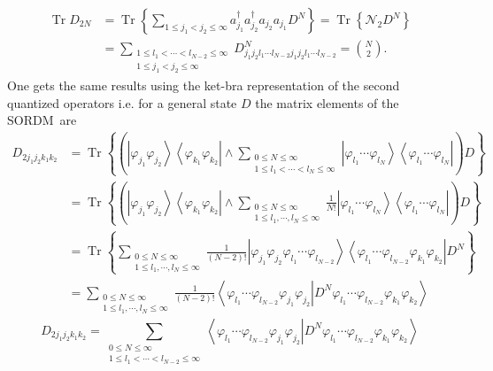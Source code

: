 \documentclass[aps,preprint]{revtex4}%
\begin{document}
\begin{align}
\operatorname{Tr}D_{2N} &  =\operatorname{Tr}\left\{  \sum_{1\leq j_{1}%
<j_{2}\leq\infty}a_{j_{1}}^{\dagger}a_{j_{2}}^{\dagger}a_{j_{2}}a_{j_{1}}%
D^{N}\right\}  =\operatorname{Tr}\left\{  \mathcal{N}_{2}D^{N}\right\}
\nonumber\\
&  =\sum_{\substack{1\leq l_{1}<\cdots<l_{N-2}\leq\infty\\1\leq j_{1}%
<j_{2}\leq\infty}}D_{j_{1}j_{2}l_{1}\cdots l_{N-2}j_{1}j_{2}l_{1}\cdots
l_{N-2}}^{N}=\binom{N}{2}.
\end{align}
One gets the same results using the ket-bra representation of the second
quantized operators i.e. for a general state $D$ the matrix elements of the
SORDM\ are
\begin{align}
D_{2j_{1}j_{2}k_{1}k_{2}} &  =\operatorname{Tr}\left\{  \left(  \left\vert
\varphi_{j_{1}}\varphi_{j_{2}}\right\rangle \left\langle \varphi_{k_{1}%
}\varphi_{k_{2}}\right\vert \wedge\sum_{\substack{0\leq N\leq\infty\\1\leq
l_{1}<\cdots<l_{N}\leq\infty}}\left\vert \varphi_{l_{1}}\cdots\varphi_{l_{N}%
}\right\rangle \left\langle \varphi_{l_{1}}\cdots\varphi_{l_{N}}\right\vert
\right)  D\right\}  \nonumber\\
&  =\operatorname{Tr}\left\{  \left(  \left\vert \varphi_{j_{1}}\varphi
_{j_{2}}\right\rangle \left\langle \varphi_{k_{1}}\varphi_{k_{2}}\right\vert
\wedge\sum_{\substack{0\leq N\leq\infty\\1\leq l_{1},\cdots,l_{N}\leq\infty
}}\frac{1}{N!}\left\vert \varphi_{l_{1}}\cdots\varphi_{l_{N}}\right\rangle
\left\langle \varphi_{l_{1}}\cdots\varphi_{l_{N}}\right\vert \right)
D\right\}  \nonumber\\
&  =\operatorname{Tr}\left\{  \sum_{\substack{0\leq N\leq\infty\\1\leq
l_{1},\cdots,l_{N}\leq\infty}}\frac{1}{\left(  N-2\right)  !}\left\vert
\varphi_{j_{1}}\varphi_{j_{2}}\varphi_{l_{1}}\cdots\varphi_{l_{N-2}%
}\right\rangle \left\langle \varphi_{l_{1}}\cdots\varphi_{l_{N-2}}%
\varphi_{k_{1}}\varphi_{k_{2}}\right\vert D^{N}\right\}  \nonumber\\
&  =\sum_{\substack{0\leq N\leq\infty\\1\leq l_{1},\cdots,l_{N}\leq\infty
}}\frac{1}{\left(  N-2\right)  !}\left\langle \left.  \varphi_{l_{1}}%
\cdots\varphi_{l_{N-2}}\varphi_{j_{1}}\varphi_{j_{2}}\right\vert D^{N}%
\varphi_{l_{1}}\cdots\varphi_{l_{N-2}}\varphi_{k_{1}}\varphi_{k_{2}%
}\right\rangle
\end{align}%
\begin{equation}
D_{2j_{1}j_{2}k_{1}k_{2}}=\sum_{\substack{0\leq N\leq\infty\\1\leq
l_{1}<\cdots<l_{N-2}\leq\infty}}\left\langle \left.  \varphi_{l_{1}}%
\cdots\varphi_{l_{N-2}}\varphi_{j_{1}}\varphi_{j_{2}}\right\vert D^{N}%
\varphi_{l_{1}}\cdots\varphi_{l_{N-2}}\varphi_{k_{1}}\varphi_{k_{2}%
}\right\rangle
\end{equation}
\end{document}
